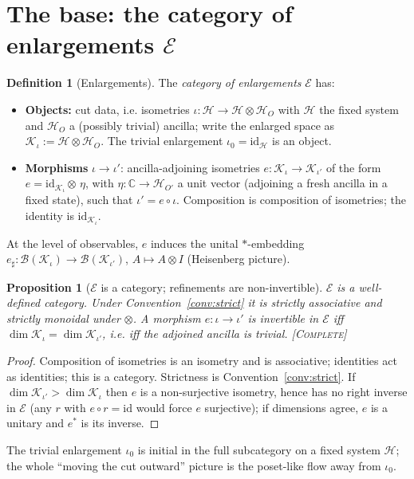 \documentclass[11pt]{article}
\newtheorem{proposition}{Proposition}
\theoremstyle{definition}
\newtheorem{definition}{Definition}
\theoremstyle{remark}
\newcommand{\Hs}{\mathcal H}
\newcommand{\K}{\mathcal K}
\newcommand{\B}{\mathcal B}
\newcommand{\Ecat}{\mathcal E}
\newcommand{\id}{\mathrm{id}}
\newcommand{\STC}{{\normalfont\textsc{[Complete]}}}
\begin{document}
\section{The base: the category of enlargements \texorpdfstring{$\Ecat$}{E}}
\label{sec:base}

\begin{definition}[Enlargements]\label{def:base}
The \emph{category of enlargements} $\Ecat$ has:
\begin{itemize}[leftmargin=1.4em]
\item \textbf{Objects:} cut data, i.e. isometries $\iota:\Hs\to\Hs\otimes\Hs_{O}$ with
$\Hs$ the fixed system and $\Hs_O$ a (possibly trivial) ancilla; write the enlarged
space as $\K_\iota:=\Hs\otimes\Hs_O$. The trivial enlargement $\iota_0=\id_\Hs$ is an
object.
\item \textbf{Morphisms} $\iota\to\iota'$: ancilla-adjoining isometries
$e:\K_\iota\to\K_{\iota'}$ of the form $e=\id_{\K_\iota}\otimes\,\eta$, with
$\eta:\mathbb C\to\Hs_{O'}$ a unit vector (adjoining a fresh ancilla in a fixed state),
such that $\iota'=e\circ\iota$. Composition is composition of isometries; the identity
is $\id_{\K_\iota}$.
\end{itemize}
At the level of observables, $e$ induces the unital $\ast$-embedding
$e_\sharp:\B(\K_\iota)\to\B(\K_{\iota'})$, $A\mapsto A\otimes I$ (Heisenberg picture).
\end{definition}

\begin{proposition}[$\Ecat$ is a category; refinements are non-invertible]
\label{prop:base}
$\Ecat$ is a well-defined category. Under Convention~\ref{conv:strict} it is strictly
associative and strictly monoidal under $\otimes$. A morphism $e:\iota\to\iota'$ is
invertible in $\Ecat$ iff $\dim\K_\iota=\dim\K_{\iota'}$, i.e. iff the adjoined ancilla
is trivial. \STC
\end{proposition}
\begin{proof}
Composition of isometries is an isometry and is associative; identities act as
identities; this is a category. Strictness is Convention~\ref{conv:strict}. If
$\dim\K_{\iota'}>\dim\K_\iota$ then $e$ is a non-surjective isometry, hence has no
right inverse in $\Ecat$ (any $r$ with $e\circ r=\id$ would force $e$ surjective); if
dimensions agree, $e$ is a unitary and $e^\ast$ is its inverse. \end{proof}

The trivial enlargement $\iota_0$ is initial in the full subcategory on a fixed system
$\Hs$; the whole ``moving the cut outward'' picture is the poset-like flow away from
$\iota_0$.
\end{document}
